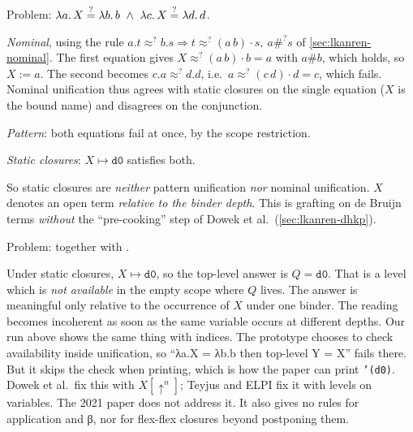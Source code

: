 \begin{tutorial}
Problem: $\abs{a}{X}\lkq\abs{b}{b}\ \wedge\ \abs{c}{X}\lkq\abs{d}{d}$.

\emph{Nominal}, using the rule $a.t\approx^? b.s\Rightarrow t\approx^?(a\,b)\cdot s,\ a\#^? s$ of
\cref{sec:lkanren-nominal}. The first equation gives $X\approx^?(a\,b)\cdot b=a$ with $a\#b$, which
holds, so $X:=a$. The second becomes $c.a\approx^?d.d$, i.e.\ $a\approx^?(c\,d)\cdot d=c$, which
fails. Nominal unification thus agrees with static closures on the single equation ($X$ is the bound
name) and disagrees on the conjunction.

\emph{Pattern}: both equations fail at once, by the scope restriction.

\emph{Static closures}: $X\mapsto\texttt{d0}$ satisfies both.

So static closures are \emph{neither} pattern unification \emph{nor} nominal unification. $X$ denotes
an open term \emph{relative to the binder depth}. This is grafting on de Bruijn terms \emph{without}
the \enquote{pre-cooking} step of Dowek et al.\ (\cref{sec:lkanren-dhkp}).
\end{tutorial}

\begin{tutorial}
Problem:  together with .

Under static closures, $X\mapsto\texttt{d0}$, so the top-level answer is $Q=\texttt{d0}$. That is a
level which is \emph{not available} in the empty scope where $Q$ lives. The answer is meaningful only
relative to the occurrence of $X$ under one binder. The reading becomes incoherent as soon as the same
variable occurs at different depths. Our \micro{} run above shows the same thing with indices. The
prototype chooses to check availability inside unification, so \enquote{λa.X = λb.b then top-level
Y = X} fails there. But it skips the check when printing, which is how the paper can print
\texttt{'(d0)}. Dowek et al.\ fix this with $X[\uparrow^n]$; Teyjus and ELPI fix it with levels on
variables. The 2021 paper does not address it. It also gives no rules for application and β, nor for
flex-flex closures beyond postponing them.
\end{tutorial}

